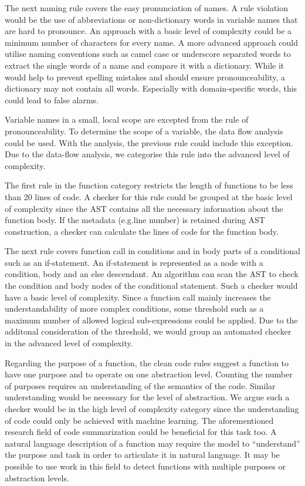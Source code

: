 The next naming rule covers the easy pronunciation of names. A rule violation would be the use of abbreviations or non-dictionary words in variable names that are hard to pronounce. An approach with a basic level of complexity could be a minimum number of characters for every name. A more advanced approach could utilise naming conventions such as camel case or underscore separated words to extract the single words of a name and compare it with a dictionary. While it would help to prevent spelling mistakes and should ensure pronounceability, a dictionary may not contain all words. Especially with domain-specific words, this could lead to false alarms.

Variable names in a small, local scope are excepted from the rule of pronounceability. To determine the scope of a variable, the data flow analysis could be used. With the analysis, the previous rule could include this exception. Due to the data-flow analysis, we categorise this rule into the advanced level of complexity.



The first rule in the function category restricts the length of functions to be less than 20 lines of code. A checker for this rule could be grouped at the basic level of complexity since the AST contains all the necessary information about the function body. If the metadata (e.g.line number) is retained during AST construction, a checker can calculate the lines of code for the function body.

The next rule covers function call in conditions and in body parts of a conditional such as an if-statement. An if-statement is represented as a node with a condition, body and an else descendant. An algorithm can scan the AST to check the condition and body nodes of the conditional statement. Such a checker would have a basic level of complexity. Since a function call mainly increases the understandability of more complex conditions, some threshold such as a maximum number of allowed logical sub-expressions could be applied. Due to the additonal consideration of the threshold, we would group an automated checker in the advanced level of complexity.

Regarding the purpose of a function, the clean code rules suggest a function to have one purpose and to operate on one abstraction level. Counting the number of purposes requires an understanding of the semantics of the code. Similar understanding would be necessary for the level of abstraction. We argue such a checker would be in the high level of complexity category since the understanding of code could only be achieved with machine learning. The aforementioned research field of code summarization could be beneficial for this task too. A natural language description of a function may require the model to \enquote{understand} the purpose and task in order to articulate it in natural language. It may be possible to use work in this field to detect functions with multiple purposes or abstraction levels.
 
